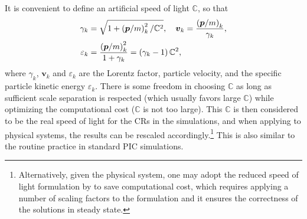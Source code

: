 \documentclass[fleqn,usenatbib]{mnras}
\begin{document}
It is convenient to define an artificial speed of light $\mathbb{C}$, so that
\begin{align}
	\gamma_k &= \sqrt{1 + \left(\boldsymbol{p} / m\right)_k^2 / \mathbb{C}^2}, \quad
	\boldsymbol{v}_k = \frac{\left(\boldsymbol{p} / m\right)_k}{\gamma_k}, \notag \\ 
	\varepsilon_k &= \frac{\left(\boldsymbol{p} / m\right)_k^2}{1 + \gamma_k} = \left(\gamma_k - 1\right) \mathbb{C}^2,
\end{align}
where $\gamma_k$, $\boldsymbol{v}_k$ and $\varepsilon_k$ are the Lorentz factor, particle velocity, and the specific particle kinetic energy $\varepsilon_k$. 
There is some freedom in choosing $\mathbb{C}$ as long as sufficient scale separation is respected (which usually favors large $\mathbb{C}$) while optimizing the computational cost ($\mathbb{C}$ is not too large). This $\mathbb{C}$ is then considered to be the real speed of light for the CRs in the simulations, and when applying to physical systems, the results can be rescaled accordingly.\footnote{Alternatively, given the physical system, one may adopt the reduced speed of light formulation by \citep{2022MNRAS.516.5143J} to save computational cost, which requires applying a number of scaling factors to the formulation and it ensures the correctness of the solutions in steady state.} This is also similar to the routine practice in standard PIC simulations.
\end{document}
